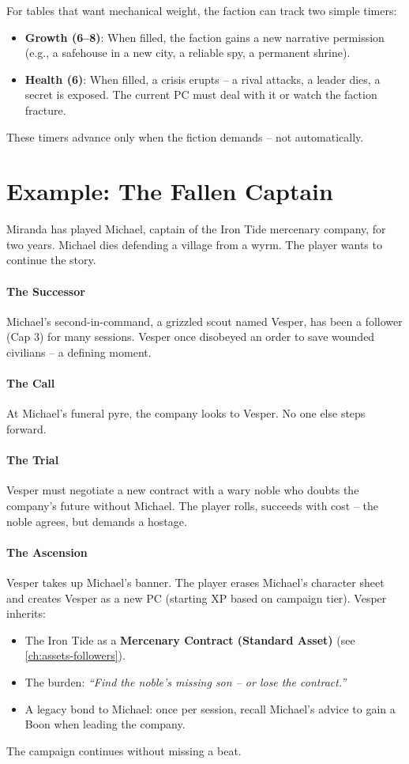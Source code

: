 For tables that want mechanical weight, the faction can track two simple timers:
\begin{itemize}
  \item \textbf{Growth (6--8)}: When filled, the faction gains a new narrative permission (e.g., a safehouse in a new city, a reliable spy, a permanent shrine).
  \item \textbf{Health (6)}: When filled, a crisis erupts -- a rival attacks, a leader dies, a secret is exposed. The current PC must deal with it or watch the faction fracture.
\end{itemize}
These timers advance only when the fiction demands -- not automatically.

\section{Example: The Fallen Captain}
\label{sec:example-fallen-captain}

Miranda has played Michael, captain of the Iron Tide mercenary company, for two years. Michael dies defending a village from a wyrm. The player wants to continue the story.

\paragraph{The Successor}
Michael's second-in-command, a grizzled scout named Vesper, has been a follower (Cap 3) for many sessions. Vesper once disobeyed an order to save wounded civilians -- a defining moment.

\paragraph{The Call}
At Michael's funeral pyre, the company looks to Vesper. No one else steps forward.

\paragraph{The Trial}
Vesper must negotiate a new contract with a wary noble who doubts the company's future without Michael. The player rolls, succeeds with cost -- the noble agrees, but demands a hostage.

\paragraph{The Ascension}
Vesper takes up Michael's banner. The player erases Michael's character sheet and creates Vesper as a new PC (starting XP based on campaign tier). Vesper inherits:
\begin{itemize}
  \item The Iron Tide as a \textbf{Mercenary Contract (Standard Asset)} (see \ref{ch:assets-followers}).
  \item The burden: \textit{``Find the noble's missing son -- or lose the contract.''}
  \item A legacy bond to Michael: once per session, recall Michael's advice to gain a Boon when leading the company.
\end{itemize}
The campaign continues without missing a beat.

